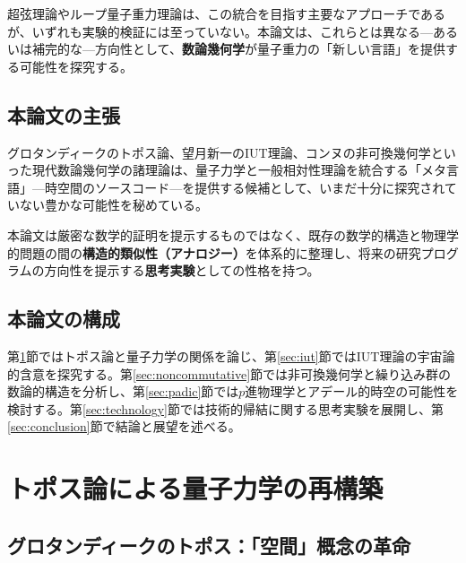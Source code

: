 \documentclass[12pt,a4paper]{ltjsarticle}
\theoremstyle{definition}
\begin{document}
超弦理論\cite{Polchinski1998}やループ量子重力理論\cite{Rovelli2004}は、この統合を目指す主要なアプローチであるが、いずれも実験的検証には至っていない。本論文は、これらとは異なる---あるいは補完的な---方向性として、\textbf{数論幾何学}が量子重力の「新しい言語」を提供する可能性を探究する。

\subsection{本論文の主張}

\begin{keyinsight}[中心的テーゼ]
グロタンディークのトポス論\cite{SGA4}、望月新一のIUT理論\cite{Mochizuki2012a}、コンヌの非可換幾何学\cite{Connes1994}といった現代数論幾何学の諸理論は、量子力学と一般相対性理論を統合する「メタ言語」---時空間のソースコード---を提供する候補として、いまだ十分に探究されていない豊かな可能性を秘めている。
\end{keyinsight}

本論文は厳密な数学的証明を提示するものではなく、既存の数学的構造と物理学的問題の間の\textbf{構造的類似性（アナロジー）}を体系的に整理し、将来の研究プログラムの方向性を提示する\textbf{思考実験}としての性格を持つ。

\subsection{本論文の構成}

第\ref{sec:topos}節ではトポス論と量子力学の関係を論じ、第\ref{sec:iut}節ではIUT理論の宇宙論的含意を探究する。第\ref{sec:noncommutative}節では非可換幾何学と繰り込み群の数論的構造を分析し、第\ref{sec:padic}節では$p$進物理学とアデール的時空の可能性を検討する。第\ref{sec:technology}節では技術的帰結に関する思考実験を展開し、第\ref{sec:conclusion}節で結論と展望を述べる。


\newpage
\section{トポス論による量子力学の再構築}
\label{sec:topos}

\subsection{グロタンディークのトポス：「空間」概念の革命}
\end{document}
